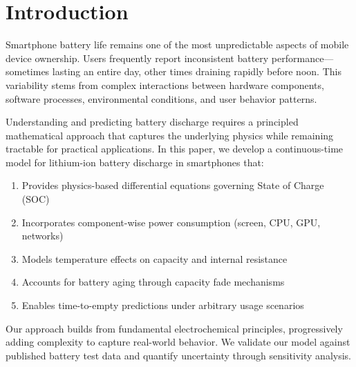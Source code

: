 \documentclass[12pt]{article}
\begin{document}
\tableofcontents
\newpage

\section{Introduction}

Smartphone battery life remains one of the most unpredictable aspects of mobile device ownership. Users frequently report inconsistent battery performance—sometimes lasting an entire day, other times draining rapidly before noon. This variability stems from complex interactions between hardware components, software processes, environmental conditions, and user behavior patterns.

Understanding and predicting battery discharge requires a principled mathematical approach that captures the underlying physics while remaining tractable for practical applications. In this paper, we develop a continuous-time model for lithium-ion battery discharge in smartphones that:

\begin{enumerate}
    \item Provides physics-based differential equations governing State of Charge (SOC)
    \item Incorporates component-wise power consumption (screen, CPU, GPU, networks)
    \item Models temperature effects on capacity and internal resistance
    \item Accounts for battery aging through capacity fade mechanisms
    \item Enables time-to-empty predictions under arbitrary usage scenarios
\end{enumerate}

Our approach builds from fundamental electrochemical principles, progressively adding complexity to capture real-world behavior. We validate our model against published battery test data and quantify uncertainty through sensitivity analysis.

\end{document}
